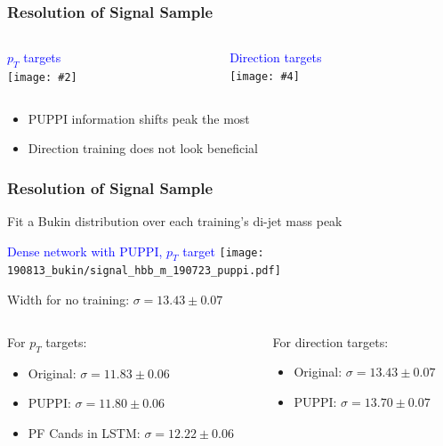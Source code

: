 \documentclass{beamer}
\newcommand{\twofigs}[4]{
  \begin{columns}
    \begin{column}{0.5\linewidth}
      \centering
      \textcolor{blue}{#1} \\
      \texttt{[image: \#2]}
    \end{column}
    \begin{column}{0.5\linewidth}
      \centering
      \textcolor{blue}{#3} \\
      \texttt{[image: \#4]}
    \end{column}
  \end{columns}
}
\begin{document}
\begin{frame}
  \frametitle{Resolution of Signal Sample}

  \twofigs{$p_T$ targets}
          {190813_compare/comparison.pdf}
          {Direction targets}
          {190813_compare_direction/comparison.pdf}

  \begin{itemize}
  \item PUPPI information shifts peak the most
  \item Direction training does not look beneficial
  \end{itemize}

\end{frame}

\begin{frame}
  \frametitle{Resolution of Signal Sample}

  Fit a Bukin distribution over each training's di-jet mass peak

  \begin{center}
    \textcolor{blue}{Dense network with PUPPI, $p_T$ target}
    \texttt{[image: 190813\_bukin/signal\_hbb\_m\_190723\_puppi.pdf]}
  \end{center}

  Width for no training: $\sigma = 13.43 \pm 0.07$

  \vspace{12pt}

  \begin{columns}
    \begin{column}{0.5\linewidth}
      For $p_T$ targets:
      \begin{itemize}
      \item Original: $\sigma = 11.83 \pm 0.06$
      \item PUPPI: $\sigma = 11.80 \pm 0.06$
      \item PF Cands in LSTM: $\sigma = 12.22 \pm 0.06$
      \end{itemize}
    \end{column}
    \begin{column}{0.5\linewidth}
      For direction targets:
      \begin{itemize}
      \item Original: $\sigma = 13.43 \pm 0.07$
      \item PUPPI: $\sigma = 13.70 \pm 0.07$
        \phantom{\item PF Cands in LSTM: \\ $\sigma = 12.22$}
        \phantom{\item PF Cands in LSTM: \\ $\sigma = 12.22$}
      \end{itemize}
    \end{column}
  \end{columns}

\end{frame}
\end{document}
